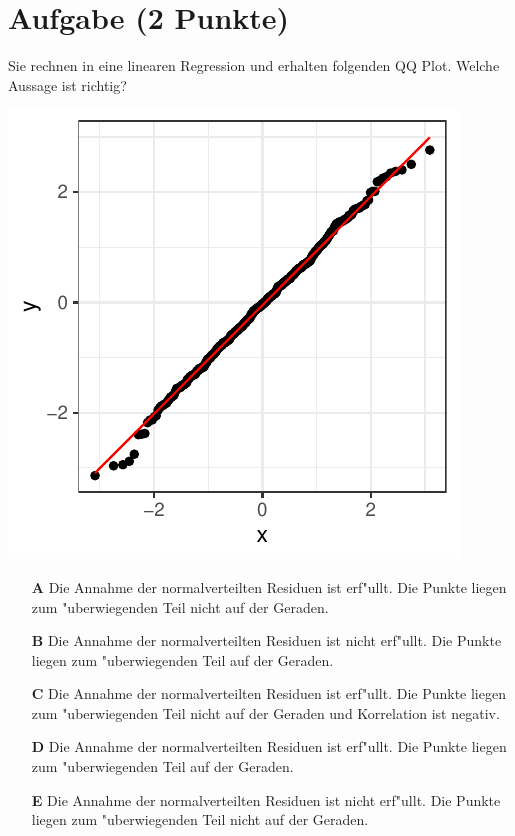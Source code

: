 \documentclass[a4paper, 10pt]{scrartcl}\usepackage[]{graphicx}\usepackage[]{xcolor}
\makeatletter
\def\maxwidth{ %
  \ifdim\Gin@nat@width>\linewidth
    \linewidth
  \else
    \Gin@nat@width
  \fi
}
\makeatother
\begin{document}
\section{Aufgabe \hfill (2 Punkte)}

Sie rechnen in eine linearen Regression und erhalten folgenden QQ
Plot. Welche Aussage ist richtig?




{\centering \includegraphics[width=\maxwidth]{img/mc-regression-05-a-1} 

}







\begin{enumerate}
\item [\textbf{A} \msquare] Die Annahme der normalverteilten Residuen ist erf{"u}llt. Die Punkte liegen zum {"u}berwiegenden Teil nicht auf der Geraden.
\item [\textbf{B} \msquare] Die Annahme der normalverteilten Residuen ist nicht erf{"u}llt. Die Punkte liegen zum {"u}berwiegenden Teil auf der Geraden.
\item [\textbf{C} \msquare] Die Annahme der normalverteilten Residuen ist erf{"u}llt. Die Punkte liegen zum {"u}berwiegenden Teil nicht auf der Geraden und Korrelation ist negativ.
\item [\textbf{D} \msquare] Die Annahme der normalverteilten Residuen ist erf{"u}llt. Die Punkte liegen zum {"u}berwiegenden Teil auf der Geraden.
\item [\textbf{E} \msquare] Die Annahme der normalverteilten Residuen ist nicht erf{"u}llt. Die Punkte liegen zum {"u}berwiegenden Teil nicht auf der Geraden.
\end{enumerate}
\end{document}
